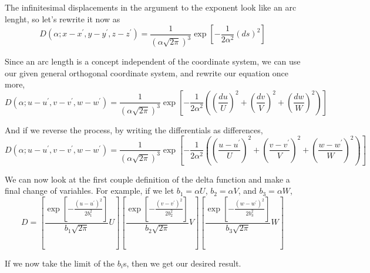 The infinitesimal displacements in the argument to the exponent look like an arc lenght, so let's rewrite it now as
$$
D\left(\alpha ; x-x^\prime, y-y^\prime, z-z^\prime \right) =
    \frac{1}{\left(\alpha \sqrt{2\pi}\right)^3}
    \exp{ \left[ -\frac{1}{2\alpha^2} \left( ds \right)^2 \right] }
$$

Since an arc length is a concept independent of the coordinate system, we can use our given general orthogonal coordinate system,
and rewrite our equation once more,
$$
D\left(\alpha ; u-u^\prime, v-v^\prime, w-w^\prime \right) =
    \frac{1}{\left(\alpha \sqrt{2\pi}\right)^3}
    \exp{ \left[ -\frac{1}{2\alpha^2} \left( 
        \left(\frac{du}{U}\right)^2 + \left(\frac{dv}{V}\right)^2 + \left(\frac{dw}{W}\right)^2 \right) 
    \right] }
$$

And if we reverse the process, by writing the differentials as differences,
$$
D\left(\alpha ; u-u^\prime, v-v^\prime, w-w^\prime \right) =
    \frac{1}{\left(\alpha \sqrt{2\pi}\right)^3}
    \exp{ \left[ -\frac{1}{2\alpha^2} \left(
        \left(\frac{u-u^\prime}{U}\right)^2 + \left(\frac{v-v^\prime}{V}\right)^2 + \left(\frac{w-w^\prime}{W}\right)^2 \right) 
    \right] }
$$

We can now look at the first couple definition of the delta function and make a final change of variahles.
For example, if we let $b_1 = \alpha U$, $b_2 = \alpha V$, and $b_3 = \alpha W$,
$$
D =
    \left[ \frac{
            \exp{ \left[ -\frac{
                \left(u-u^\prime\right)^2
            }{2b_{1}^{2}}  \right] }
        }{b_1 \sqrt{2\pi}}
        U
     \right]
     \left[ \frac{
            \exp{ \left[ -\frac{
                \left(v-v^\prime\right)^2
            }{2b_{2}^{2}}  \right] }
        }{b_2 \sqrt{2\pi}}
        V
     \right]
     \left[ \frac{
            \exp{ \left[ -\frac{
                \left(w-w^\prime\right)^2
            }{2b_{3}^{2}}  \right] }
        }{b_3 \sqrt{2\pi}}
        W
     \right]
$$

If we now take the limit of the $b_i$s, then we get our desired result.
\\~\\
